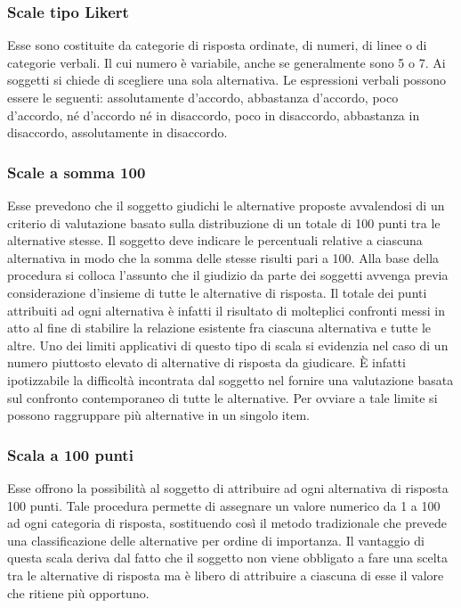 \subsubsection{Scale tipo Likert}
Esse sono costituite da categorie di risposta ordinate, di numeri, di linee o di categorie verbali. Il cui numero è variabile, anche se generalmente sono 5 o 7. Ai soggetti si chiede di scegliere una sola alternativa. Le espressioni verbali possono essere le seguenti: assolutamente d’accordo, abbastanza d’accordo, poco d’accordo, né d’accordo né in disaccordo, poco in disaccordo, abbastanza in disaccordo, assolutamente in disaccordo.

\subsubsection{Scale a somma 100}
Esse prevedono che il soggetto giudichi le alternative proposte avvalendosi di un criterio di valutazione basato sulla distribuzione di un totale di 100 punti tra le alternative stesse. Il soggetto deve indicare le percentuali relative a ciascuna alternativa in modo che la somma delle stesse risulti pari a 100. Alla base della procedura si colloca l’assunto che il giudizio da parte dei soggetti avvenga previa considerazione d’insieme di tutte le alternative di risposta.\newline
Il totale dei punti attribuiti ad ogni alternativa è infatti il risultato di molteplici confronti messi in atto al fine di stabilire la relazione esistente fra ciascuna alternativa e tutte le altre.\newline
Uno dei limiti applicativi di questo tipo di scala si evidenzia nel caso di un numero piuttosto elevato di alternative di risposta da giudicare. È infatti ipotizzabile la difficoltà incontrata dal soggetto nel fornire una valutazione basata sul confronto contemporaneo di tutte le alternative. Per ovviare a tale limite si possono raggruppare più alternative in un singolo item.

\subsubsection{Scala a 100 punti}
Esse offrono la possibilità al soggetto di attribuire ad ogni alternativa di risposta 100 punti. Tale procedura permette di assegnare un valore numerico da 1 a 100 ad ogni categoria di risposta, sostituendo così il metodo tradizionale che prevede una classificazione delle alternative per ordine di importanza. Il vantaggio di questa scala deriva dal fatto che il soggetto non viene obbligato a fare una scelta tra le alternative di risposta ma è libero di attribuire a ciascuna di esse il valore che ritiene più opportuno.

